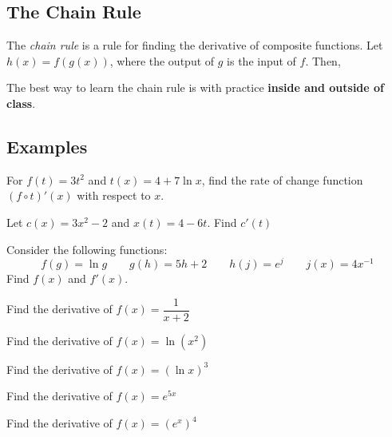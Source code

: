 \documentclass[notes]{subfiles}
\begin{document}
	\subsection*{The Chain Rule}
		The \emph{chain rule} is a rule for finding the derivative of composite functions.  Let $h(x) = f(g(x))$, where the output of $g$ is the input of $f$.  Then,

		The best way to learn the chain rule is with practice \textbf{inside and outside of class}.
		
	\subsection*{Examples}
		\begin{ex} 
			For $f(t) = 3t^2$ and $t(x) = 4+7\ln x$, find the rate of change function $(f\circ t)'(x)$ with respect to $x$.
		\end{ex}
			 
 		\begin{ex}
 			Let $c(x) = 3x^2 - 2$ and $x(t) = 4-6t$.  Find $c'(t)$
 		\end{ex}
 			 \newpage
 			 
 		\begin{ex}
 			Consider the following functions: 
				\[f(g) = \ln g \qquad g(h) = 5h + 2 \qquad h(j) = e^j\qquad j(x) = 4x^{-1}\]
			Find $f(x)$ and $f'(x)$.
 		\end{ex}
 			
 		\begin{ex}
 			Find the derivative of $f(x) = \dfrac{1}{x+2}$  
 		\end{ex}
 			
 		\begin{ex}
 			Find the derivative of $f(x) = \ln(x^2)$  
 		\end{ex}
 			\newpage

 		\begin{ex}
 			Find the derivative of $f(x) = (\ln x) ^3$  
 		\end{ex}
 		
 		\begin{ex}
 			Find the derivative of $f(x) = e^{5x}$  
 		\end{ex}
 		
 		\begin{ex}
 			Find the derivative of $f(x) = (e^x)^4$  
 		\end{ex}
 			\newpage
 			
\end{document}
